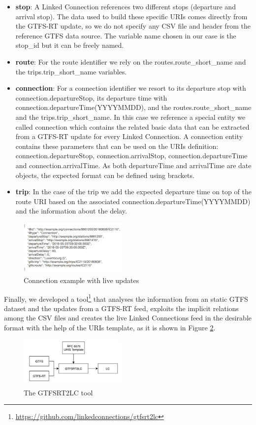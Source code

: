 \documentclass[sw]{iosart2x}
\begin{document}
\begin{itemize}
\item \textbf{stop}: A Linked Connection references two different stops (departure and arrival stop). The data used to build these specific URIs comes directly from the GTFS-RT update, so we do not specify any CSV file and header from the reference GTFS data source. The variable name chosen in our case is the stop\_id but it can be freely named.
\item \textbf{route}: For the route identifier we rely on the routes.route\_short\_name and the trips.trip\_short\_name variables.
\item \textbf{connection}:  For a connection identifier we resort to its departure stop with connection.departureStop, its departure time with connection.departureTime(YYYYMMDD), and the routes.route\_short\_name and the trips.trip\_short\_name. In this case we reference a special entity we called connection which contains the related basic data that can be extracted from a GTFS-RT update for every Linked Connection. A connection entity contains these parameters that can be used on the URIs definition: connection.departureStop, connection.arrivalStop, connection.departureTime and connection.arrivalTime. As both departureTime and arrivalTime are date objects, the expected format can be defined using brackets.
\item \textbf{trip}: In the case of the trip we add the expected departure time on top of the route URI based on the associated connection.departureTime(YYYYMMDD) and the information about the delay.
\end{itemize}

\begin{figure}[t]
	\includegraphics[width=0.47\textwidth]{images/example_connection_rt.png}
	\caption{Connection example with live updates}\label{fig:connection_rt}
\end{figure}

Finally, we developed a tool\footnote{\url{https://github.com/linkedconnections/gtfsrt2lc}} that analyses the information from an static GTFS dataset and the updates from a GTFS-RT feed, exploits the implicit relations among the CSV files and creates the live Linked Connections feed in the desirable format with the help of the URIs template, as it is shown in Figure \ref{fig:gtfsrt2lc}.
\begin{figure}[t]
	\includegraphics[width=0.47\textwidth]{images/gtfsrt2lc.png}
	\caption{The GTFSRT2LC tool}\label{fig:gtfsrt2lc}
\end{figure}
\end{document}

